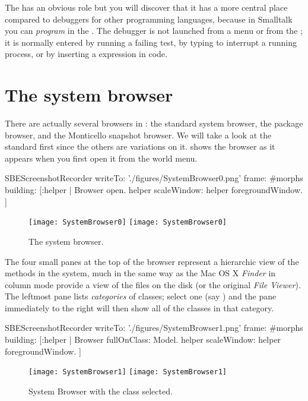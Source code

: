 \documentclass[a4paper,10pt,twoside]{book}
\begin{document}
The  has an obvious role but you will discover that it has a more central place compared to debuggers for other programming languages, because in Smalltalk you can \emph{program} in the .
The debugger is not launched from a menu or from the \toolsflap; it is normally entered by running a failing test, by typing  to interrupt a running process, or by inserting a  expression in code.


\section{The system browser}
\label{sec:browser} %

There are actually several browsers in \sq: the standard system browser, the package browser, and the Monticello snapshot browser.
We will take a look at the standard  first since the others are variations on it.
 shows the browser as it appears when you first open it from the world menu.

\begin{ExecuteSmalltalkScript}
SBEScreenshotRecorder writeTo: './figures/SystemBrowser0.png' frame: #morphs building: [:helper |
	Browser open.
	helper scaleWindow: helper foregroundWindow.
]
\end{ExecuteSmalltalkScript}
\begin{figure}[htbp]
   \centering
   \ifluluelse
	 {\texttt{[image: SystemBrowser0]} }
	 {\texttt{[image: SystemBrowser0]} }
   \caption{The system browser.}
   \label{fig:SystemBrowser0}
\end{figure}

The four small panes at the top of the browser represent a hierarchic view of the methods in the system, much in the same way as the Mac OS X \textit{Finder} in column mode provide a view of the files on the disk (or the original  \textit{File Viewer}).
The leftmost pane lists \emph{categories} of classes; select one (say ) and the pane immediately to the right will then show all of the classes in that category.

\begin{ExecuteSmalltalkScript}
SBEScreenshotRecorder writeTo: './figures/SystemBrowser1.png' frame: #morphs building: [:helper |
	Browser fullOnClass: Model.
	helper scaleWindow: helper foregroundWindow.
]
\end{ExecuteSmalltalkScript}
\begin{figure}[htbp]
   \centering
   \ifluluelse
	   {\texttt{[image: SystemBrowser1]} }
	   {\texttt{[image: SystemBrowser1]} }
   \caption{System Browser with the class  selected.
   \label{fig:SystemBrowserModel}}
\end{figure}
\end{document}
